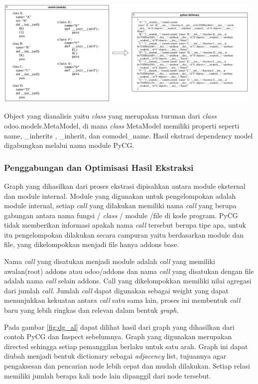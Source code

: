 \begin{center}
	\includegraphics[width=13cm]{img/bab_3/inspectSample.png}
	\label{contoh_inspectSample}
\end{center}

Object yang dianalisis yaitu \textit{class} yang merupakan turunan dari \textit{class} odoo.models.MetaModel, di mana \textit{class} MetaModel memiliki properti seperti  name, \_inherits , \_inherit, dan comodel\_name. Hasil ekstrasi dependency model digabungkan melalui nama module PyCG.

\subsubsection{Penggabungan dan Optimisasi Hasil Ekstraksi}
Graph yang dihasilkan dari proses ekstrasi dipisahkan antara module eksternal dan module internal. Module yang digunakan untuk pengelompokan adalah module internal, setiap \textit{call} yang dilakukan memiliki nama \textit{call} yang berupa gabungan antara nama fungsi / \textit{class} / module /file di kode program. PyCG tidak memberikan informasi apakah nama \textit{call} tersebut berupa tipe apa, untuk itu pengelompokan dilakukan secara campuran yaitu berdasarkan module dan file, yang dikelompokkan menjadi file hanya addons base.

Nama \textit{call} yang disatukan menjadi module adalah \textit{call} yang memiliki awalan(root) addons atau odoo/addons dan nama \textit{call} yang disatukan dengan file adalah nama \textit{call} selain addons. Call yang dikelompokkan memiliki nilai agregasi dari jumlah \textit{call}. Jumlah \textit{call} dapat digunakan sebagai weight yang dapat menunjukkan kekuatan antara \textit{call} satu sama lain, proses ini membentuk \textit{call} baru yang lebih ringkas dan relevan dalam bentuk \textit{graph}. 

Pada gambar \ref{fig:dg_al} dapat dilihat hasil dari graph yang dihasilkan dari contoh PyCG dan Inspect sebelumnya. Graph yang digunakan merupakan directed sehingga setiap pemanggilan berlaku untuk satu arah. Graph ini dapat diubah menjadi bentuk dictionary sebagai \textit{adjacency} list, tujuannya agar pengaksesan dan pencarian node lebih cepat dan mudah dilakukan. Setiap relasi memiliki jumlah berapa kali node lain dipanggil dari node tersebut.

